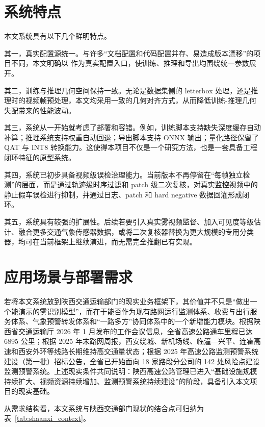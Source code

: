 \section{系统特点}

本文系统具有以下几个鲜明特点。

其一，真实配置源统一。与许多“文档配置和代码配置并存、易造成版本漂移”的项目不同，本文明确以  作为真实配置入口，使训练、推理和导出均围绕统一参数展开。

其二，训练与推理几何空间保持一致。无论是数据集侧的 letterbox 处理，还是推理时的视频帧预处理，本文均采用一致的几何对齐方式，从而降低训练-推理几何失配带来的性能波动。

其三，系统从一开始就考虑了部署和容错。例如，训练脚本支持缺失深度缓存自动补算；推理系统支持权重自动回退；导出脚本支持 ONNX 输出；量化路径保留了 QAT 与 INT8 转换能力。这使得本项目不仅是一个研究方法，也是一套具备工程闭环特征的原型系统。

其四，系统已初步具备视频级误检治理能力。当前版本不再停留在“每帧独立检测”的层面，而是通过轨迹级时序过滤和 patch 级二次复核，对真实监控视频中的静止假车误检进行抑制，并通过日志、patch 和 hard negative 数据回灌形成闭环。

其五，系统具有较强的扩展性。后续若要引入真实雾视频监督、加入可见度等级估计、融合更多交通气象传感器数据，或将二次复核器替换为更大规模的专用分类器，均可在当前框架上继续演进，而无需完全推翻已有实现。

\section{应用场景与部署需求}

若将本文系统放到陕西交通运输部门的现实业务框架下，其价值并不只是“做出一个能演示的雾识别模型”，而在于能否作为现有路网运行监测体系、收费与出行服务体系、气象预警转发体系和“一路多方”协同体系中的一个新增能力模块。根据陕西省交通运输厅 2026 年 1 月发布的工作会议信息，全省高速公路通车里程已达 6895 公里；根据 2025 年末路网周报，西安绕城、新机场线、临潼—兴平、连霍高速和西安外环等线路长期维持高交通量状态；根据 2025 年高速公路监测预警系统建设（第一批）招标公告，全省已开始面向 18 家路段分公司的 142 处风险点建设监测预警系统\cite{shaanxiMeeting2026,shaanxiWeekly2025,shaanxiRiskProject2025}。上述现实条件共同说明：陕西高速公路管理已进入“基础设施规模持续扩大、视频资源持续增加、监测预警系统持续建设”的阶段，具备引入本文项目的现实基础。

从需求结构看，本文系统与陕西交通部门现状的结合点可归纳为表~\ref{tab:shaanxi_context}。

